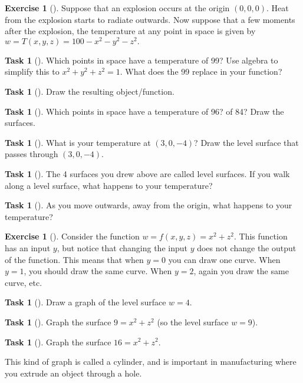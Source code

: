 \documentclass[10pt,]{book}
\theoremstyle{plain}
\theoremstyle{definition}
\theoremstyle{definition}
\theoremstyle{definition}
\theoremstyle{definition}
\newtheorem{exploration}[project]{Exercise}
\newtheorem{task}[project]{Task}
\theoremstyle{definition}
\numberwithin{equation}{section}
\begin{document}
\begin{exploration}[]\label{exploration-114}
Suppose that an explosion occurs at the origin \((0,0,0)\). Heat from the explosion starts to radiate outwards. Now suppose that a few moments after the explosion, the temperature at any point in space is given by \(w=T(x,y,z)=100-x^2-y^2-z^2.\)%
\begin{task}[]\label{task-222}
Which points in space have a temperature of 99? Use algebra to simplify this to \(x^2+y^2+z^2=1\). What does the 99 replace in your function?%
%
\end{task}
\begin{task}[]\label{task-223}
Draw the resulting object/function.%
\end{task}
\begin{task}[]\label{task-224}
Which points in space have a temperature of 96? of 84? Draw the surfaces.%
\end{task}
\begin{task}[]\label{task-225}
What is your temperature at \((3,0,-4)\)? Draw the level surface that passes through \((3,0,-4)\).%
\end{task}
\begin{task}[]\label{task-226}
The 4 surfaces you drew above are called level surfaces. If you walk along a level surface, what happens to your temperature?%
\end{task}
\begin{task}[]\label{task-227}
As you move outwards, away from the origin, what happens to your temperature?%
\end{task}
\end{exploration}
\begin{exploration}[]\label{exploration-115}
Consider the function \(w=f(x,y,z)=x^2+z^2\). This function has an input \(y\), but notice that changing the input \(y\) does not change the output of the function. This means that when \(y=0\) you can draw one curve. When \(y=1\), you should draw the same curve. When \(y=2\), again you draw the same curve, etc.%
\begin{task}[]\label{task-228}
Draw a graph of the level surface \(w=4\).%
\end{task}
\begin{task}[]\label{task-229}
Graph the surface \(9=x^2+z^2\) (so the level surface \(w=9\)).%
\end{task}
\begin{task}[]\label{task-230}
Graph the surface \(16=x^2+z^2\).%
\end{task}
This kind of graph is called a cylinder, and is important in manufacturing where you extrude an object through a hole.%
\end{exploration}
\end{document}
